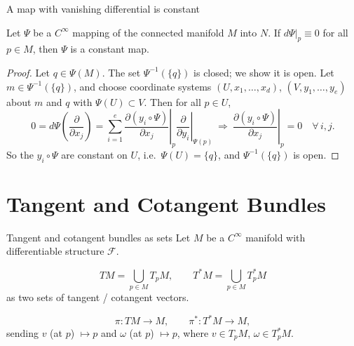 \documentclass[10pt]{beamer}
\begin{document}
\begin{frame}{A map with vanishing differential is constant}
	\begin{theorem}
		Let $\Psi$ be a $C^\infty$ mapping of the connected manifold $M$
		into $N$. If $d\Psi|_p \equiv 0$ for all $p \in M$, then $\Psi$ is
		a constant map.
	\end{theorem}
	\begin{proof}
		Let $q \in \Psi(M)$. The set $\Psi^{-1}(\{q\})$ is closed; we show
		it is open. Let $m \in \Psi^{-1}(\{q\})$, and choose coordinate
		systems $(U, x_1, \dots, x_d)$, $(V, y_1, \dots, y_e)$ about $m$
		and $q$ with $\Psi(U) \subset V$. Then for all $p \in U$,
		\[
			0 = d\Psi\left( \frac{\partial}{\partial x_j} \right)
			= \sum_{i=1}^{e} \left. \frac{\partial (y_i \circ \Psi)}
			{\partial x_j} \right|_{p}
			\left. \frac{\partial}{\partial y_i} \right|_{\Psi(p)}
			\ \Longrightarrow\
			\left. \frac{\partial (y_i \circ \Psi)}{\partial x_j}
			\right|_{p} = 0 \quad \forall\, i, j.
		\]
		So the $y_i \circ \Psi$ are constant on $U$, i.e.\ $\Psi(U) = \{q\}$,
		and $\Psi^{-1}(\{q\})$ is open. \qedhere
	\end{proof}
\end{frame}

\section{Tangent and Cotangent Bundles}

\begin{frame}{Tangent and cotangent bundles as sets}
	Let $M$ be a $C^\infty$ manifold with differentiable structure
	$\mathcal{F}$.
	\begin{definition}
		\[
			TM = \bigcup_{p \in M} T_p M,
			\qquad
			T^* M = \bigcup_{p \in M} T_p^* M
		\]
		as two sets of tangent / cotangent vectors.
	\end{definition}
	\begin{definition}
		\[
			\pi : TM \longrightarrow M, \qquad
			\pi^* : T^* M \longrightarrow M,
		\]
		sending $v$ (at $p$) $\mapsto p$ and $\omega$ (at $p$) $\mapsto p$,
		where $v \in T_p M$, $\omega \in T_p^* M$.
	\end{definition}
\end{frame}
\end{document}

